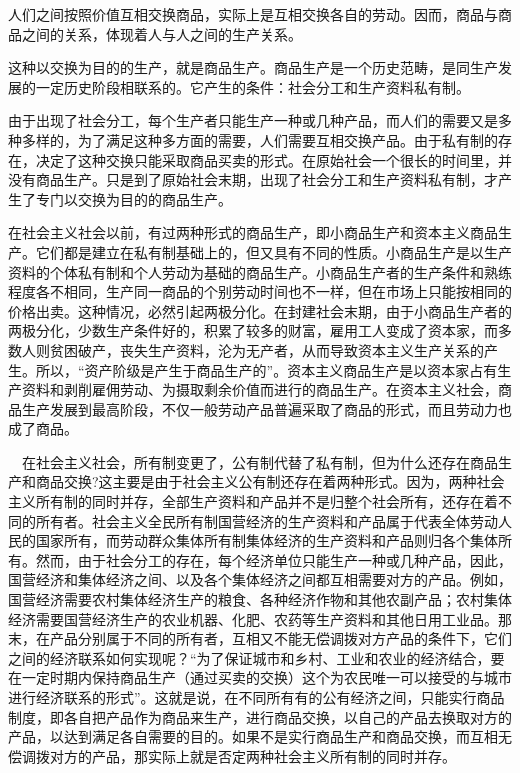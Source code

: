 \documentclass{book}
\begin{document}
人们之间按照价值互相交换商品，实际上是互相交换各自的劳动。因而，商品与商品之间的关系，体现着人与人之间的生产关系。

这种以交换为目的的生产，就是商品生产。商品生产是一个历史范畴，是同生产发展的一定历史阶段相联系的。它产生的条件：社会分工和生产资料私有制。

由于出现了社会分工，每个生产者只能生产一种或几种产品，而人们的需要又是多种多样的，为了满足这种多方面的需要，人们需要互相交换产品。由于私有制的存在，决定了这种交换只能采取商品买卖的形式。在原始社会一个很长的时间里，并没有商品生产。只是到了原始社会末期，出现了社会分工和生产资料私有制，才产生了专门以交换为目的的商品生产。

在社会主义社会以前，有过两种形式的商品生产，即小商品生产和资本主义商品生产。它们都是建立在私有制基础上的，但又具有不同的性质。小商品生产是以生产资料的个体私有制和个人劳动为基础的商品生产。小商品生产者的生产条件和熟练程度各不相同，生产同一商品的个别劳动时间也不一样，但在市场上只能按相同的价格出卖。这种情况，必然引起两极分化。在封建社会末期，由于小商品生产者的两极分化，少数生产条件好的，积累了较多的财富，雇用工人变成了资本家，而多数人则贫困破产，丧失生产资料，沦为无产者，从而导致资本主义生产关系的产生。所以，“资产阶级是产生于商品生产的”。资本主义商品生产是以资本家占有生产资料和剥削雇佣劳动、为摄取剩余价值而进行的商品生产。在资本主义社会，商品生产发展到最高阶段，不仅一般劳动产品普遍采取了商品的形式，而且劳动力也成了商品。

　在社会主义社会，所有制变更了，公有制代替了私有制，但为什么还存在商品生产和商品交换?这主要是由于社会主义公有制还存在着两种形式。因为，两种社会主义所有制的同时并存，全部生产资料和产品并不是归整个社会所有，还存在着不同的所有者。社会主义全民所有制国营经济的生产资料和产品属于代表全体劳动人民的国家所有，而劳动群众集体所有制集体经济的生产资料和产品则归各个集体所有。然而，由于社会分工的存在，每个经济单位只能生产一种或几种产品，因此，国营经济和集体经济之间、以及各个集体经济之间都互相需要对方的产品。例如，国营经济需要农村集体经济生产的粮食、各种经济作物和其他农副产品；农村集体经济需要国营经济生产的农业机器、化肥、农药等生产资料和其他日用工业品。那末，在产品分别属于不同的所有者，互相又不能无偿调拨对方产品的条件下，它们之间的经济联系如何实现呢？“为了保证城市和乡村、工业和农业的经济结合，要在一定时期内保持商品生产（通过买卖的交换）这个为农民唯一可以接受的与城市进行经济联系的形式”。这就是说，在不同所有有的公有经济之间，只能实行商品制度，即各自把产品作为商品来生产，进行商品交换，以自己的产品去换取对方的产品，以达到满足各自需要的目的。如果不是实行商品生产和商品交换，而互相无偿调拨对方的产品，那实际上就是否定两种社会主义所有制的同时并存。
\end{document}
